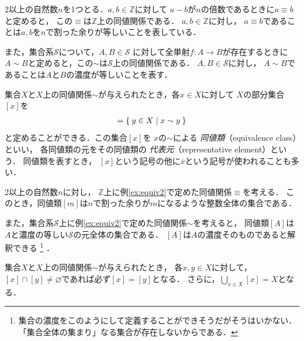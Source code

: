    \begin{ex} \label{ex:equiv2}
     2以上の自然数$n$を1つとる．$a , b \in \mathbb{Z}$に対して
     $a-b$が$n$の倍数であるときに$a \equiv b$と定めると，
     この$\equiv$は$\mathbb{Z}$上の同値関係である．
     $a,b \in \mathbb{Z}$に対し，
     $a \equiv b$であることは$a,b$を$n$で割った余りが等しいことを表している．
     
     また，集合系$\mathscr{S}$について，$A ,B \in \mathscr{S}$
     に対して全単射$f: A \longrightarrow B$が存在するときに
     $A \sim B$と定めると，この$\sim$は$\mathscr{S}$上の同値関係である．
     $A,B \in \mathscr{S}$に対し，
     $A \sim B$であることは$A$と$B$の濃度が等しいことを表す．
   \end{ex}

   集合$X$と$X$上の同値関係$\sim$が与えられたとき，各$x \in X$に対して
   $X$の部分集合$[x]$を
   \begin{align}
     [x] = \Set{ y \in X \mid x \sim y }
     \label{eq:equivclass}
   \end{align}
   と定めることができる．この集合$[x]$を
   $x$の$\sim$による
   \emph{同値類}（equivalence class）といい，
   各同値類の元をその同値類の
   \emph{代表元}（representative element）という．
   同値類を表すとき，
   $[x]$という記号の他に$\overline{x}$という記号が使われることも多い．

   \begin{ex} \label{equivclass}
     2以上の自然数$n$に対し，
     $\mathbb{Z}$上に例\ref{ex:equiv2}で定めた同値関係$\equiv$を考える．
     このとき，同値類$[m]$は$n$で割った余りが$m$になるような整数全体の集合である．

     また，集合系$\mathscr{S}$上に例\ref{ex:equiv2}で定めた同値関係$\sim$を考えると，
     同値類$[A]$は$A$と濃度の等しい$\mathscr{S}$の元全体の集合である．
     $[A]$は$A$の濃度そのものであると解釈できる
     \footnote{集合の濃度をこのようにして定義することができそうだがそうはいかない．
     「集合全体の集まり」なる集合が存在しないからである．}
     ．
   \end{ex}

   \begin{lemma} \label{lemma:equivclass}
     集合$X$と$X$上の同値関係$\sim$が与えられたとき，
     各$x,y \in X$に対して，
     $[x] \cap [y] \neq \varnothing$であれば必ず$[x] = [y]$となる．
     さらに，$\bigcup_{x \in X} [x] = X$となる．
   \end{lemma}

